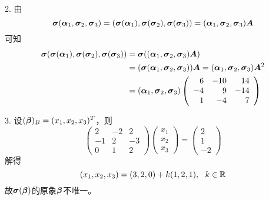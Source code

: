 \begin{frame}
  \begin{jie}
    2. 由
    $$
    \boldsymbol{\sigma}(\boldsymbol{\alpha}_1,\boldsymbol{\sigma}_2,\boldsymbol{\sigma}_3)=(\boldsymbol{\sigma}(\boldsymbol{\alpha}_1),\boldsymbol{\sigma}(\boldsymbol{\sigma}_2),\boldsymbol{\sigma}(\boldsymbol{\sigma}_3))=(\boldsymbol{\alpha}_1,\boldsymbol{\sigma}_2,\boldsymbol{\sigma}_3)\boldsymbol{A}
    $$
    可知
    $$
    \begin{aligned}
      \boldsymbol{\sigma}(\boldsymbol{\sigma}(\boldsymbol{\alpha}_1),\boldsymbol{\sigma}(\boldsymbol{\sigma}_2),\boldsymbol{\sigma}(\boldsymbol{\sigma}_3))
      &=\boldsymbol{\sigma}((\boldsymbol{\alpha}_1,\boldsymbol{\sigma}_2,\boldsymbol{\sigma}_3)\boldsymbol{A})\\
      &=(\boldsymbol{\sigma}(\boldsymbol{\alpha}_1,\boldsymbol{\sigma}_2,\boldsymbol{\sigma}_3))\boldsymbol{A}
      =(\boldsymbol{\alpha}_1,\boldsymbol{\sigma}_2,\boldsymbol{\sigma}_3)\boldsymbol{A}^2\\
      &=(\boldsymbol{\alpha}_1,\boldsymbol{\sigma}_2,\boldsymbol{\sigma}_3)\left(
      \begin{array}{rrr}
        6&-10&14\\
        -4&9&-14\\
        1&-4&7
      \end{array}
    \right)
    \end{aligned}
    $$
  \end{jie}
\end{frame}



\begin{frame}
\begin{jie}
  3. 设$(\boldsymbol{\beta})_B=(x_1,x_2,x_3)^T$，则
  $$
  \left(
    \begin{array}{rrr}
      2&-2&2\\
      -1&2&-3\\
      0&1&2
    \end{array}
  \right)\left(
    \begin{array}{c}
      x_1\\
      x_2\\
      x_3
    \end{array}
  \right)=\left(
    \begin{array}{r}
      2\\
      1\\
      -2
    \end{array}
  \right)
  $$
  解得
  $$
  (x_1,x_2,x_3)=(3,2,0)+k(1,2,1), ~~k\in \mathbb R
  $$
  故$\boldsymbol{\sigma}(\boldsymbol{\beta})$的原象$\boldsymbol{\beta}$不唯一。
\end{jie}
\end{frame}


